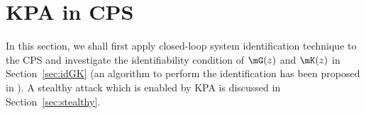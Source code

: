 \section{KPA in CPS}\label{sec:sysid}
In this section, we shall first apply closed-loop system identification technique to the CPS and investigate the identifiability condition of $\mG(z)$ and $\mK(z)$ in Section~\ref{sec:idGK} (an algorithm to perform the identification has been proposed in \cite{Yuan2015}). A stealthy attack which is enabled by KPA is discussed in Section~\ref{sec:stealthy}.

